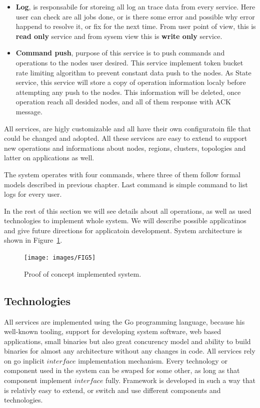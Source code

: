 \begin{itemize}
	\item \textbf{Log}, is responsabile for storeing all log an trace data from every service. Here user can check are all jobs done, or is there some error and possible why error happend to resolve it, or fix for the next time. From user point of view, this is \textbf{read only} service and from sysem view this is \textbf{write only} service.
	\item \textbf{Command push}, purpose of this service is to push commands and operations to the nodes user desired. This service implement token bucket rate limiting algorithm to prevent constant data push to the nodes. As State service, this service will store a copy of operation information localy before attempting any push to the nodes. This information will be deleted, once operation reach all desided nodes, and all of them response with ACK message.
\end{itemize}

All services, are higly customizable and all have their own configuratoin file that could be changed and adopted. All these services are easy to extend to support new operations and informations about nodes, regions, clusters, topologies and latter on applications as well. 

The system operates with four commands, where three of them follow formal models described in previous chapter. Last command is simple command to list logs for every user.

In the rest of this section we will see details about all operations, as well as used technologies to implement whole system. We will describe possible applicatinos and give future directions for applicatoin development. System architecture is shown in Figure~\ref{fig:fig11}.

\begin{figure}[H]
	\begin{center}
		\texttt{[image: images/FIG5]}
	\end{center}
	\vspace{-0.9cm}
	\caption{Proof of concept implemented system.}
	\label{fig:fig11}
\end{figure}
%
%
\subsection{Technologies}\label{sec:technologies}
%
All services are implemented using the Go programming language, because his well-known tooling, support for developing system software, web based applications, small binaries but also great concurency model and ability to build binaries for almost any architecture without any changes in code. All services rely on go inplicit $interface$ implementation mechanism. Every technology or component used in the system can be swaped for some other, as long as that component implement $interface$ fully. Framework is developed in such a way that is relativly easy to extend, or switch and use different components and technologies.

